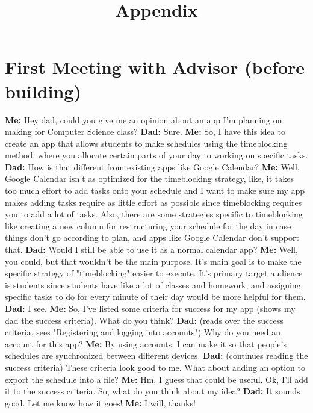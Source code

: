 \documentclass[12pt]{report}
\title{Appendix}
\begin{document}
\centerline{\textcolor{msblue}{
		\textbf{\fontsize{13}{13}\MyTitle}
	}}


\bgroup\obeylines

\section*{First Meeting with Advisor (before building)}
\textbf{Me:} Hey dad, could you give me an opinion about an app I'm planning on making for Computer Science class?
\textbf{Dad:} Sure.
\textbf{Me:} So, I have this idea to create an app that allows students to make schedules using the timeblocking method, where you allocate certain parts of your day to working on specific tasks.
\textbf{Dad:} How is that different from existing apps like Google Calendar?
\textbf{Me:} Well, Google Calendar isn't as optimized for the timeblocking strategy, like, it takes too much effort to add tasks onto your schedule and I want to make sure my app makes adding tasks require as little effort as possible since timeblocking requires you to add a lot of tasks. Also, there are some strategies specific to timeblocking like creating a new column for restructuring your schedule for the day in case things don't go according to plan, and apps like Google Calendar don't support that.
\textbf{Dad:} Would I still be able to use it as a normal calendar app?
\textbf{Me:} Well, you could, but that wouldn't be the main purpose. It's main goal is to make the specific strategy of "timeblocking" easier to execute. It's primary target audience is students since students have like a lot of classes and homework, and assigning specific tasks to do for every minute of their day would be more helpful for them.
\textbf{Dad:} I see.
\textbf{Me:} So, I've listed some criteria for success for my app (shows my dad the success criteria). What do you think?
\textbf{Dad:} (reads over the success criteria, sees "Registering and logging into accounts") Why do you need an account for this app?
\textbf{Me:} By using accounts, I can make it so that people's schedules are synchronized between different devices.
\textbf{Dad:} (continues reading the success criteria) These criteria look good to me. What about adding an option to export the schedule into a file?
\textbf{Me:} Hm, I guess that could be useful. Ok, I'll add it to the success criteria. So, what do you think about my idea?
\textbf{Dad:} It sounds good. Let me know how it goes!
\textbf{Me:} I will, thanks!
\end{document}
